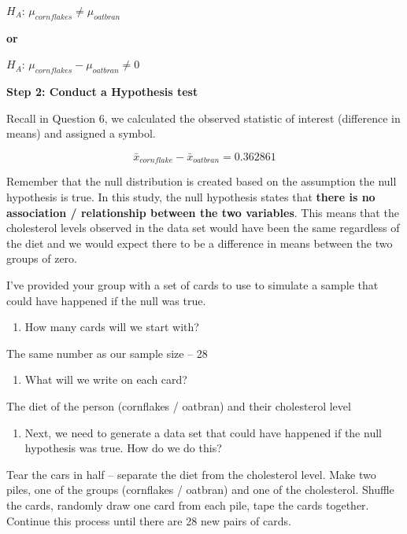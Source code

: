 \documentclass[
  letterpaper,
  DIV=11,
  numbers=noendperiod]{scrartcl}
\providecommand{\tightlist}{%
  \setlength{\itemsep}{0pt}\setlength{\parskip}{0pt}}\usepackage{longtable,booktabs,array}
\begin{document}
\(H_A\): \(\mu_{cornflakes} \neq \mu_{oatbran}\)

\textbf{or}

\(H_A\): \(\mu_{cornflakes} - \mu_{oatbran} \neq 0\)

\textbf{Step 2: Conduct a Hypothesis test}

Recall in Question 6, we calculated the observed statistic of interest
(difference in means) and assigned a symbol.

\[\bar{x}_{cornflake} - \bar{x}_{oatbran} = 0.362861\]

Remember that the null distribution is created based on the assumption
the null hypothesis is true. In this study, the null hypothesis states
that \textbf{there is no association / relationship between the two
variables}. This means that the cholesterol levels observed in the data
set would have been the same regardless of the diet and we would expect
there to be a difference in means between the two groups of zero.

I've provided your group with a set of cards to use to simulate a sample
that could have happened if the null was true.

\begin{enumerate}
\def\labelenumi{\arabic{enumi}.}
\setcounter{enumi}{15}
\tightlist
\item
  How many cards will we start with?
\end{enumerate}

The same number as our sample size -- 28

\begin{enumerate}
\def\labelenumi{\arabic{enumi}.}
\setcounter{enumi}{16}
\tightlist
\item
  What will we write on each card?
\end{enumerate}

The diet of the person (cornflakes / oatbran) and their cholesterol
level

\begin{enumerate}
\def\labelenumi{\arabic{enumi}.}
\setcounter{enumi}{17}
\tightlist
\item
  Next, we need to generate a data set that could have happened if the
  null hypothesis was true. How do we do this?
\end{enumerate}

Tear the cars in half -- separate the diet from the cholesterol level.
Make two piles, one of the groups (cornflakes / oatbran) and one of the
cholesterol. Shuffle the cards, randomly draw one card from each pile,
tape the cards together. Continue this process until there are 28 new
pairs of cards.
\end{document}
